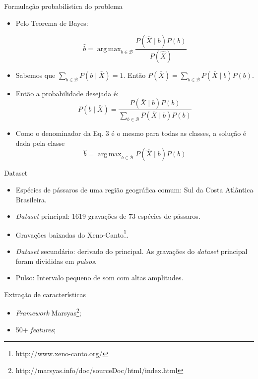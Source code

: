 \documentclass[10pt]{beamer}
\DeclareMathOperator*{\argmaxA}{arg\,max} %
\begin{document}
\begin{frame}{Formulação probabilística do problema}
\begin{itemize}
\item Pelo Teorema de Bayes:

\begin{equation}
\hat{b} = \argmaxA_{b \in \mathcal{B}} \frac{P(\hat{X} \mid b)  P(b)}{P(\hat{X})}
\end{equation}

\item Sabemos que $\sum_{b \in \mathcal{B}}P(b \mid \bar{X}) = 1$. Então
$P(\bar{X}) = \sum_{b \in \mathcal{B}} P(\bar{X} \mid b)P(b)$.

\item Então a probabilidade desejada é:
\begin{equation}
P(b \mid \bar{X}) = \frac{P(\bar{X} \mid b)P(b)}{\sum_{b \in \mathcal{B}} P(\bar{X} \mid b)P(b)}
\end{equation}

\item Como o denominador da Eq. 3 é o mesmo para todas as classes, a solução é dada
pela classe
\begin{equation}
\hat{b} = \argmaxA_{b \in \mathcal{B}}P(\hat{X} \mid b)P(b)
\end{equation}

\end{itemize}
\end{frame}

\begin{frame}[fragile]{Dataset}
\begin{itemize}
\item Espécies de pássaros de uma região geográfica comum: Sul da Costa Atlântica
Brasileira.
\item \textit{Dataset} principal: 1619 gravações de 73 espécies de pássaros.
\item Gravações baixadas do Xeno-Canto\footnote{http://www.xeno-canto.org/}.
\item \textit{Dataset} secundário: derivado do principal. As gravações do \textit{dataset}
principal foram divididas em \textit{pulsos}.
\item Pulso: Intervalo pequeno de som com altas amplitudes.

\end{itemize}
\end{frame}


\begin{frame}[fragile]{Extração de características}
\begin{itemize}
\item \textit{Framework} Marsyas\footnote{http://marsyas.info/doc/sourceDoc/html/index.html};
\item 50+ \textit{features};
\end{itemize}
\end{frame}
\end{document}

